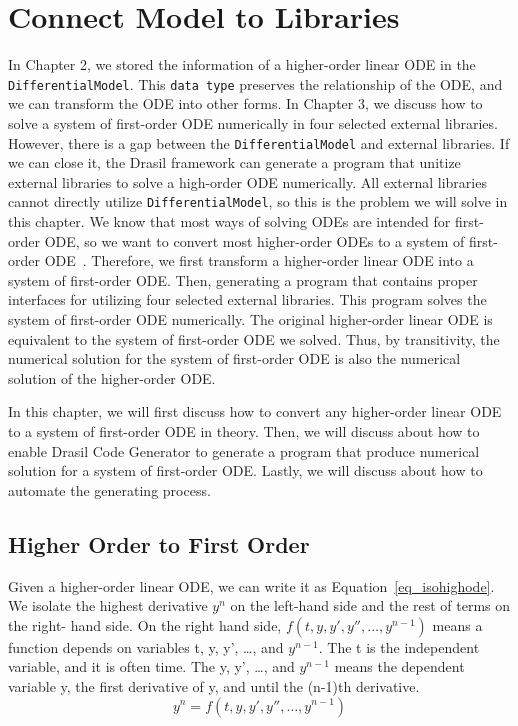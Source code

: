 \chapter{Connect Model to Libraries}
In Chapter 2, we stored the information of a higher-order linear ODE in the \verb|DifferentialModel|. This \verb|data type| preserves the relationship of the ODE, and we can transform the ODE into other forms. In Chapter 3, we discuss how to solve a system of first-order ODE numerically in four selected external libraries. However, there is a gap between the \verb|DifferentialModel| and external libraries. If we can close it, the Drasil framework can generate a program that unitize external libraries to solve a high-order ODE numerically. All external libraries cannot directly utilize \verb|DifferentialModel|, so this is the problem we will solve in this chapter. We know that most ways of solving ODEs are intended for first-order ODE, so we want to convert most higher-order ODEs to a system of first-order ODE~\citep{converthigherode}. Therefore, we first transform a higher-order linear ODE into a system of first-order ODE. Then, generating a program that contains proper interfaces for utilizing four selected external libraries. This program solves the system of first-order ODE numerically. The original higher-order linear ODE is equivalent to the system of first-order ODE we solved. Thus, by transitivity, the numerical solution for the system of first-order ODE is also the numerical solution of the higher-order ODE.

In this chapter, we will first discuss how to convert any higher-order linear ODE to a system of first-order ODE in theory. Then, we will discuss about how to enable Drasil Code Generator to generate a program that produce numerical solution for a system of first-order ODE. Lastly, we will discuss about how to automate the generating process.

\section{Higher Order to First Order}
\label{se_hightofirst}
Given a higher-order linear ODE, we can write it as Equation~\ref{eq_isohighode}. We isolate the highest derivative $y^n$ on the left-hand side and the rest of terms on the right- hand side. On the right hand side, $f (t, y, y', y'', \dots, y^{n-1})$ means a function depends on variables t, y, y', \dots, and $y^{n-1}$. The t is the independent variable, and it is often time. The y, y', \dots, and $y^{n-1}$ means the dependent variable y, the first derivative of y, and until the (n-1)th derivative.
\begin{equation} \label{eq_isohighode}
  y^n = f (t, y, y', y'', \dots, y^{n-1})
\end{equation}

